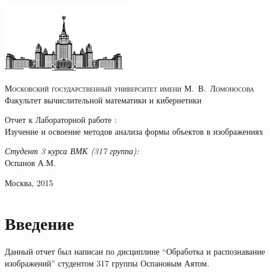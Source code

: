 \documentclass[12pt, a4paper]{article}
\begin{document}
    \thispagestyle{empty}

    \begin{singlespace}
    \begin{titlepage}
        \begin{center}
            \includegraphics[height = 3cm]{msu.png}

            {\scshape Московский государственный университет имени М.~В.~Ломоносова}\\
            Факультет вычислительной математики и кибернетики\\
            \centerline{\hfill\hrulefill\hrulefill\hrulefill\hrulefill\hfill}

            \vfill

            {\LARGE Отчет к Лабораторной работе : \\ Изучение и освоение методов анализа формы объектов в изображениях}

            \vspace{1cm}

        \end{center}

        \vfill
        \begin{flushright}
            \textit{Студент 3 курса ВМК (317 группа):}\\
                Оспанов А.М.

            \vspace{5mm}

        \end{flushright}

        \vfill

        \begin{center}
        Москва, 2015
        \end{center}
    \end{titlepage}
    \end{singlespace}

    \tableofcontents

    \newpage
    \section{Введение}
        Данный отчет был написан по дисциплине ``Обработка и распознавание изображений'' студентом 317 группы Оспановым Аятом.
\end{document}
